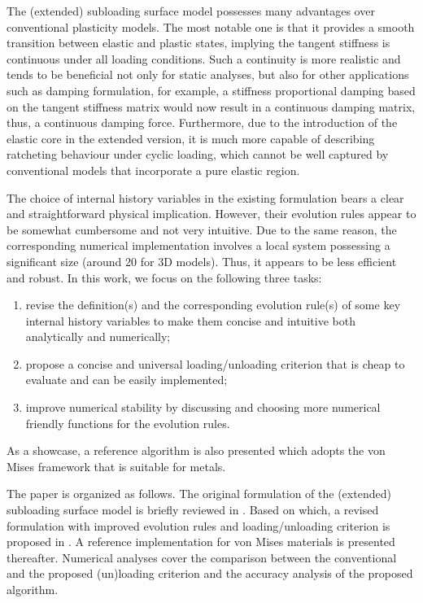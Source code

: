 The (extended) subloading surface model possesses many advantages over conventional plasticity models.
The most notable one is that it provides a smooth transition between elastic and plastic states, implying the tangent stiffness is continuous under all loading conditions.
Such a continuity is more realistic and tends to be beneficial not only for static analyses, but also for other applications such as damping formulation, for example, a stiffness proportional damping based on the tangent stiffness matrix would now result in a continuous damping matrix, thus, a continuous damping force.
Furthermore, due to the introduction of the elastic core in the extended version, it is much more capable of describing ratcheting behaviour under cyclic loading, which cannot be well captured by conventional models that incorporate a pure elastic region.

The choice of internal history variables in the existing formulation bears a clear and straightforward physical implication.
However, their evolution rules \citep[see, e.g.,][]{Hashiguchi2024} appear to be somewhat cumbersome and not very intuitive.
Due to the same reason, the corresponding numerical implementation \citep[see, e.g.,][]{Fincato2017,Anjiki2019,Anjiki2021} involves a local system possessing a significant size (around \num{20} for 3D models).
Thus, it appears to be less efficient and robust.
In this work, we focus on the following three tasks:
\begin{enumerate}
    \item revise the definition(s) and the corresponding evolution rule(s) of some key internal history variables to make them concise and intuitive both analytically and numerically;
    \item propose a concise and universal loading/unloading criterion that is cheap to evaluate and can be easily implemented;
    \item improve numerical stability by discussing and choosing more numerical friendly functions for the evolution rules.
\end{enumerate}
As a showcase, a reference algorithm is also presented which adopts the von Mises framework that is suitable for metals.

The paper is organized as follows.
The original formulation of the (extended) subloading surface model is briefly reviewed in .
Based on which, a revised formulation with improved evolution rules and loading/unloading criterion is proposed in .
A reference implementation for von Mises materials is presented thereafter.
Numerical analyses cover the comparison between the conventional and the proposed (un)loading criterion and the accuracy analysis of the proposed algorithm.